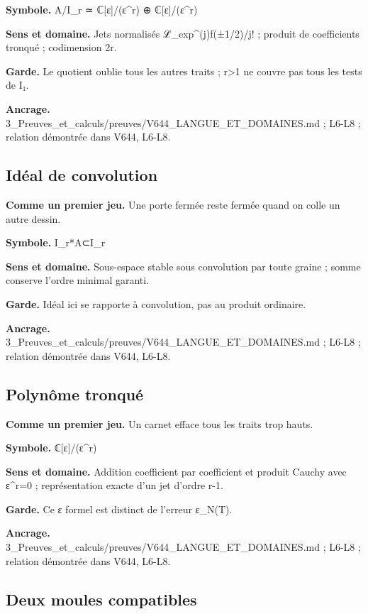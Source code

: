 \documentclass[
  9pt,
  a4paper,
]{article}
\begin{document}
\textbf{Symbole.} A/I\_r ≃ ℂ{[}ε{]}/(ε\^{}r) ⊕ ℂ{[}ε{]}/(ε\^{}r)

\textbf{Sens et domaine.} Jets normalisés ℒ\_exp\^{}(j)f(±1/2)/j! ;
produit de coefficients tronqué ; codimension 2r.

\textbf{Garde.} Le quotient oublie tous les autres traits ;
r\textgreater1 ne couvre pas tous les tests de I₁.

\textbf{Ancrage.}
3\_Preuves\_et\_calculs/preuves/V644\_LANGUE\_ET\_DOMAINES.md ; L6-L8 ;
relation démontrée dans V644, L6-L8.

\hypertarget{iduxe9al-de-convolution}{%
\subsection{Idéal de convolution}\label{iduxe9al-de-convolution}}

\textbf{Comme un premier jeu.} Une porte fermée reste fermée quand on
colle un autre dessin.

\textbf{Symbole.} I\_r*A⊂I\_r

\textbf{Sens et domaine.} Sous-espace stable sous convolution par toute
graine ; somme conserve l'ordre minimal garanti.

\textbf{Garde.} Idéal ici se rapporte à convolution, pas au produit
ordinaire.

\textbf{Ancrage.}
3\_Preuves\_et\_calculs/preuves/V644\_LANGUE\_ET\_DOMAINES.md ; L6-L8 ;
relation démontrée dans V644, L6-L8.

\hypertarget{polynuxf4me-tronquuxe9}{%
\subsection{Polynôme tronqué}\label{polynuxf4me-tronquuxe9}}

\textbf{Comme un premier jeu.} Un carnet efface tous les traits trop
hauts.

\textbf{Symbole.} ℂ{[}ε{]}/(ε\^{}r)

\textbf{Sens et domaine.} Addition coefficient par coefficient et
produit Cauchy avec ε\^{}r=0 ; représentation exacte d'un jet d'ordre
r-1.

\textbf{Garde.} Ce ε formel est distinct de l'erreur ε\_N(T).

\textbf{Ancrage.}
3\_Preuves\_et\_calculs/preuves/V644\_LANGUE\_ET\_DOMAINES.md ; L6-L8 ;
relation démontrée dans V644, L6-L8.

\hypertarget{deux-moules-compatibles}{%
\subsection{Deux moules compatibles}\label{deux-moules-compatibles}}
\end{document}
